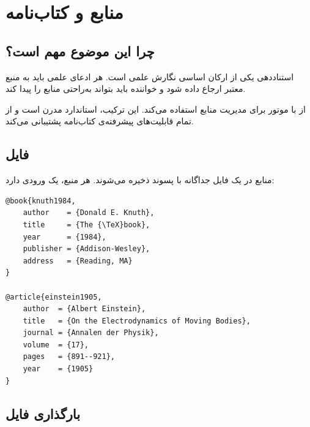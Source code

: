 
\chapter{منابع و کتاب‌نامه}
\label{chap:bibliography}

\section{چرا این موضوع مهم است؟}
\label{sec:bibliography-why}

استناددهی یکی از ارکان اساسی نگارش علمی است.
هر ادعای علمی باید به منبع معتبر ارجاع داده شود
و خواننده باید بتواند به‌راحتی منابع را پیدا
کند.

 از  با موتور
 برای مدیریت منابع استفاده می‌کند.
این ترکیب، استاندارد مدرن  است و از
تمام قابلیت‌های پیشرفته‌ی کتاب‌نامه پشتیبانی
می‌کند.


\section{فایل }
\label{sec:bibliography-bibfile}

منابع در یک فایل جداگانه با پسوند 
ذخیره می‌شوند. هر منبع، یک ورودی 
دارد:

\begin{latin}
\begin{verbatim}
@book{knuth1984,
    author    = {Donald E. Knuth},
    title     = {The {\TeX}book},
    year      = {1984},
    publisher = {Addison-Wesley},
    address   = {Reading, MA}
}

@article{einstein1905,
    author  = {Albert Einstein},
    title   = {On the Electrodynamics of Moving Bodies},
    journal = {Annalen der Physik},
    volume  = {17},
    pages   = {891--921},
    year    = {1905}
}
\end{verbatim}
\end{latin}


\section{بارگذاری فایل }
\label{sec:bibliography-loading}

